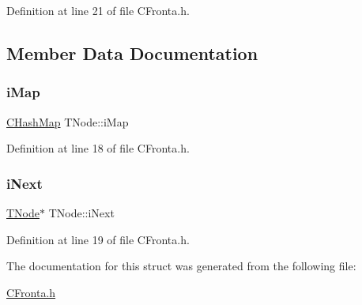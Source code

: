 Definition at line 21 of file C\+Fronta.\+h.



\subsection{Member Data Documentation}
\mbox{\label{struct_t_node_a012479fdf8dd85030f4ec37cf68cd30d}} 
\subsubsection{\texorpdfstring{i\+Map}{iMap}}
{\footnotesize\ttfamily \hyperlink{class_c_hash_map}{C\+Hash\+Map} T\+Node\+::i\+Map}



Definition at line 18 of file C\+Fronta.\+h.

\mbox{\label{struct_t_node_af9887827de1e76bde1de70d9cf42eb2e}} 
\subsubsection{\texorpdfstring{i\+Next}{iNext}}
{\footnotesize\ttfamily \hyperlink{struct_t_node}{T\+Node}$\ast$ T\+Node\+::i\+Next}



Definition at line 19 of file C\+Fronta.\+h.



The documentation for this struct was generated from the following file\+:\begin{DoxyCompactItemize}
\item 
\hyperlink{_c_fronta_8h}{C\+Fronta.\+h}\end{DoxyCompactItemize}
